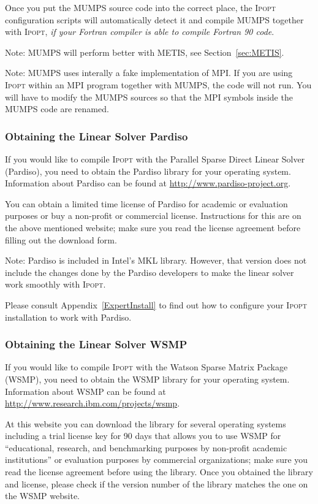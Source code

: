 \documentclass[10pt]{article}
\newcommand{\Ipopt}{\textsc{Ipopt}\xspace}
\begin{document}
Once you put the MUMPS source code into the correct place, the \Ipopt
configuration scripts will automatically detect it and compile MUMPS
together with \Ipopt, \emph{if your Fortran compiler is able to compile
Fortran 90 code}.

Note: MUMPS will perform better with METIS, see
Section~\ref{sec:METIS}.

Note: MUMPS uses interally a fake implementation of MPI.  If you are
using \Ipopt within an MPI program together with MUMPS, the code will
not run.  You will have to modify the MUMPS sources so that the MPI
symbols inside the MUMPS code are renamed.

\subsubsection{Obtaining the Linear Solver Pardiso}\label{sec:Pardiso}

If you would like to compile \Ipopt with the Parallel Sparse Direct
Linear Solver (Pardiso), you need to obtain the Pardiso library for
your operating system.  Information about Pardiso can be found at
\url{http://www.pardiso-project.org}.

You can obtain a limited time license of Pardiso for academic or
evaluation purposes or buy a non-profit or commercial
license. Instructions for this are on the above mentioned
website; make sure you read the license agreement before filling out
the download form.

Note: Pardiso is included in Intel's MKL library.  However, that
version does not include the changes done by the Pardiso developers to
make the linear solver work smoothly with \Ipopt.

Please consult Appendix~\ref{ExpertInstall} to find out how to
configure your \Ipopt installation to work with Pardiso.

\subsubsection{Obtaining the Linear Solver WSMP}\label{sec:WSMP}

If you would like to compile \Ipopt with the Watson Sparse Matrix
Package (WSMP), you need to obtain the WSMP library for your operating
system.  Information about WSMP can be found at
\url{http://www.research.ibm.com/projects/wsmp}.

At this website you can download the library for several operating systems
including a trial license key for 90 days that allows you to use WSMP
for ``educational, research, and benchmarking purposes by
non-profit academic institutions'' or evaluation purposes by commercial
organizations;
make sure you read the license agreement before using the library.
Once you obtained the library and license, please check if the version
number of the library matches the one on the WSMP website.
\end{document}
